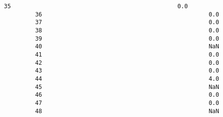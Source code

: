 \documentclass[11pt]{article}
\begin{document}
\begin{Verbatim}[commandchars=\\\{\}]
         35                                                0.0                                                                                      
         36                                                0.0                                                                                      
         37                                                0.0                                                                                      
         38                                                0.0                                                                                      
         39                                                0.0                                                                                      
         40                                                NaN                                                                                      
         41                                                0.0                                                                                      
         42                                                0.0                                                                                      
         43                                                0.0                                                                                      
         44                                                4.0                                                                                      
         45                                                NaN                                                                                      
         46                                                0.0                                                                                      
         47                                                0.0                                                                                      
         48                                                NaN                                                                                      
         

\end{Verbatim}
\end{document}
